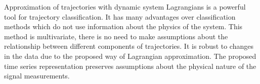 \documentclass[sn-mathphys-num]{sn-jnl}
\theoremstyle{thmstylethree}
\theoremstyle{thmstyletwo}
\theoremstyle{thmstyleone}
\begin{document}
Approximation of trajectories with dynamic system Lagrangians is a powerful tool for trajectory classification. It has many advantages over classification methods which do not use information about the physics of the system. This method is multivariate, there is no need to make  assumptions about the relationship between different components of trajectories. It is robust to changes in the data due to the proposed way of Lagrangian approximation. The proposed time series representation preserves assumptions about the physical nature of the signal measurements.
\textbf{}


\end{document}
